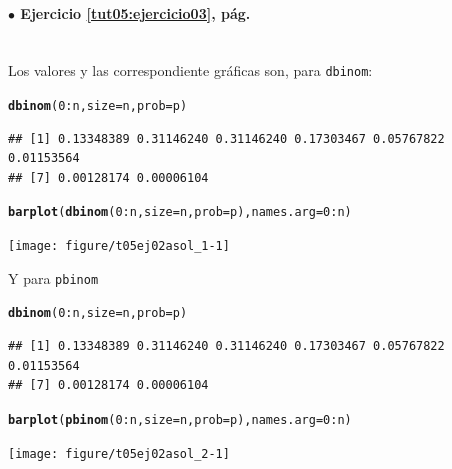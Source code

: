\documentclass[10pt,a4paper]{article}\usepackage[]{graphicx}\usepackage[]{color}
\makeatletter
\newcommand{\hlnum}[1]{\textcolor[rgb]{0.686,0.059,0.569}{#1}}%
\newcommand{\hlopt}[1]{\textcolor[rgb]{0,0,0}{#1}}%
\newcommand{\hlstd}[1]{\textcolor[rgb]{0.345,0.345,0.345}{#1}}%
\newcommand{\hlkwc}[1]{\textcolor[rgb]{0.333,0.667,0.333}{#1}}%
\newcommand{\hlkwd}[1]{\textcolor[rgb]{0.737,0.353,0.396}{\textbf{#1}}}%
\newenvironment{kframe}{%
 \def\at@end@of@kframe{}%
 \ifinner\ifhmode%
  \def\at@end@of@kframe{\end{minipage}}%
  \begin{minipage}{\columnwidth}%
 \fi\fi%
 \def\FrameCommand##1{\hskip\@totalleftmargin \hskip-\fboxsep
 \colorbox{shadecolor}{##1}\hskip-\fboxsep
     \hskip-\linewidth \hskip-\@totalleftmargin \hskip\columnwidth}%
 \MakeFramed {\advance\hsize-\width
   \@totalleftmargin\z@ \linewidth\hsize
   \@setminipage}}%
 {\par\unskip\endMakeFramed%
 \at@end@of@kframe}
\newenvironment{knitrout}{}{} %
\makeatother
\begin{document}
\paragraph{\bf $\bullet$ Ejercicio \ref{tut05:ejercicio03}, pág. \pageref{tut05:ejercicio03}}
\label{tut05:ejercicio03:sol}\quad\\

Los valores y las correspondiente gráficas son, para {\tt dbinom}:
\begin{knitrout}
\color{fgcolor}\begin{kframe}
\begin{alltt}
\hlkwd{dbinom}\hlstd{(}\hlnum{0}\hlopt{:}\hlstd{n,} \hlkwc{size}\hlstd{=n,} \hlkwc{prob}\hlstd{=p)}
\end{alltt}
\begin{verbatim}
## [1] 0.13348389 0.31146240 0.31146240 0.17303467 0.05767822 0.01153564
## [7] 0.00128174 0.00006104
\end{verbatim}
\begin{alltt}
\hlkwd{barplot}\hlstd{(}\hlkwd{dbinom}\hlstd{(}\hlnum{0}\hlopt{:}\hlstd{n,} \hlkwc{size}\hlstd{=n,} \hlkwc{prob}\hlstd{=p),} \hlkwc{names.arg} \hlstd{=} \hlnum{0}\hlopt{:}\hlstd{n)}
\end{alltt}
\end{kframe}
\texttt{[image: figure/t05ej02asol\_1-1]} 

\end{knitrout}
Y para {\tt pbinom}
\begin{knitrout}
\color{fgcolor}\begin{kframe}
\begin{alltt}
\hlkwd{dbinom}\hlstd{(}\hlnum{0}\hlopt{:}\hlstd{n,} \hlkwc{size}\hlstd{=n,} \hlkwc{prob}\hlstd{=p)}
\end{alltt}
\begin{verbatim}
## [1] 0.13348389 0.31146240 0.31146240 0.17303467 0.05767822 0.01153564
## [7] 0.00128174 0.00006104
\end{verbatim}
\begin{alltt}
\hlkwd{barplot}\hlstd{(}\hlkwd{pbinom}\hlstd{(}\hlnum{0}\hlopt{:}\hlstd{n,} \hlkwc{size}\hlstd{=n,} \hlkwc{prob}\hlstd{=p),} \hlkwc{names.arg} \hlstd{=} \hlnum{0}\hlopt{:}\hlstd{n)}
\end{alltt}
\end{kframe}
\texttt{[image: figure/t05ej02asol\_2-1]} 

\end{knitrout}
\end{document}
